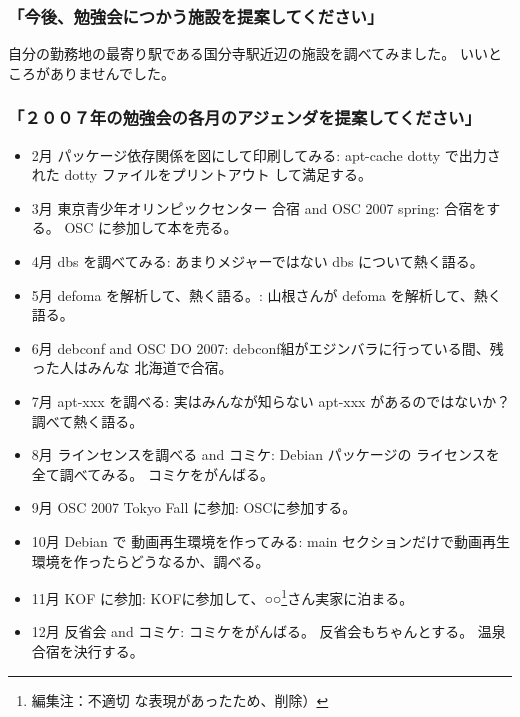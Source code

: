 \documentclass[mingoth,a4paper,twoside]{jsarticle}
\begin{document}
\subsubsection{ 「今後、勉強会につかう施設を提案してください」}

自分の勤務地の最寄り駅である国分寺駅近辺の施設を調べてみました。
いいところがありませんでした。
	
	
\subsubsection{「２００７年の勉強会の各月のアジェンダを提案してください」}
{\small
\begin{itemize}
 \item	 2月 パッケージ依存関係を図にして印刷してみる:
		apt-cache dotty で出力された dotty ファイルをプリントアウト
		して満足する。
		
 \item	 3月 東京青少年オリンピックセンター 合宿 and OSC 2007 spring:
		合宿をする。
		OSC に参加して本を売る。

 \item	 4月 dbs を調べてみる:
		あまりメジャーではない dbs について熱く語る。

 \item	 5月 defoma を解析して、熱く語る。:
		山根さんが defoma を解析して、熱く語る。

 \item	 6月 debconf and OSC DO 2007:
		debconf組がエジンバラに行っている間、残った人はみんな
		北海道で合宿。

 \item	 7月 apt-xxx を調べる:
		実はみんなが知らない apt-xxx があるのではないか？
		調べて熱く語る。

 \item	 8月  ラインセンスを調べる  and コミケ:
		Debian パッケージの ライセンスを全て調べてみる。
		コミケをがんばる。

 \item	 9月 OSC 2007 Tokyo Fall に参加:
		OSCに参加する。

 \item	 10月 Debian で 動画再生環境を作ってみる:
		main セクションだけで動画再生環境を作ったらどうなるか、調べる。

 \item 	 11月 KOF に参加:
		KOFに参加して、○○\footnote{編集注：不適切
な表現があったため、削除）}さん実家に泊まる。

 \item	 12月 反省会 and コミケ:
		コミケをがんばる。
		反省会もちゃんとする。
		温泉合宿を決行する。
\end{itemize}
}
\end{document}
